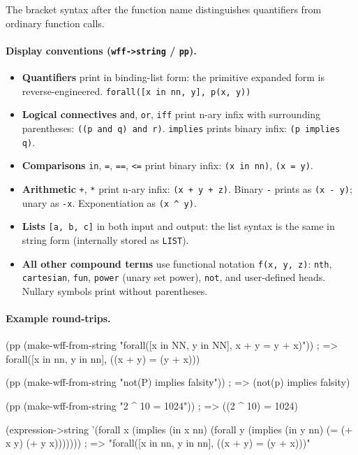 \noindent
The bracket syntax after the function name distinguishes quantifiers
from ordinary function calls.

\paragraph{Display conventions (\texttt{wff->string} / \texttt{pp}).}
\begin{itemize}
\item \begin{sloppypar}\textbf{Quantifiers} print in binding-list form:
  the primitive expanded form is reverse-engineered.
  \texttt{forall([x in nn, y], p(x, y))}\end{sloppypar}
\item \textbf{Logical connectives} \texttt{and}, \texttt{or}, \texttt{iff}
  print n-ary infix with surrounding parentheses:
  \texttt{((p and q) and r)}.
  \texttt{implies} prints binary infix: \texttt{(p implies q)}.
\item \textbf{Comparisons} \texttt{in}, \texttt{=}, \texttt{==},
  \texttt{<=} print binary infix: \texttt{(x in nn)}, \texttt{(x = y)}.
\item \textbf{Arithmetic} \texttt{+}, \texttt{*} print n-ary infix:
  \texttt{(x + y + z)}.  Binary \texttt{-} prints as \texttt{(x - y)};
  unary as \texttt{-x}.  Exponentiation as \texttt{(x \textasciicircum{} y)}.
\item \textbf{Lists} \texttt{[a, b, c]} in both input and output: the
  list syntax is the same in string form (internally stored as \texttt{LIST}).
\item \textbf{All other compound terms} use functional notation
  \texttt{f(x, y, z)}: \texttt{nth}, \texttt{cartesian}, \texttt{fun},
  \texttt{power} (unary set power), \texttt{not}, and user-defined heads.
  Nullary symbols print without parentheses.
\end{itemize}

\paragraph{Example round-trips.}
\begin{VNBsnip}
(pp (make-wff-from-string "forall([x in NN, y in NN], x + y = y + x)"))
; => forall([x in nn, y in nn], ((x + y) = (y + x)))

(pp (make-wff-from-string "not(P) implies falsity"))
; => (not(p) implies falsity)

(pp (make-wff-from-string "2 ^ 10 = 1024"))
; => ((2 ^ 10) = 1024)

(expression->string '(forall x (implies (in x nn)
                       (forall y (implies (in y nn) (= (+ x y) (+ y x)))))))
; => "forall([x in nn, y in nn], ((x + y) = (y + x)))"
\end{VNBsnip}

